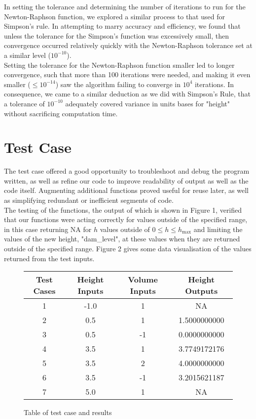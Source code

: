 \documentclass[a4paper, 11pt, oneside]{article}
\begin{document}
In setting the tolerance and determining the number of iterations to run for the Newton-Raphson function, we explored a similar process to that used for Simpson's rule. In attempting to marry accuracy and efficiency, we found that unless the tolerance for the Simpson's function was excessively small, then convergence occurred relatively quickly with the Newton-Raphson tolerance set at a similar level ($10^{-10}$). \\


Setting the tolerance for the Newton-Raphson function smaller led to longer convergence, such that more than 100 iterations were needed, and making it even smaller ($\leq 10^{-14}$) saw the algorithm failing to converge in $10^{4}$ iterations. In consequence, we came to a similar deduction as we did with Simpson’s Rule, that a tolerance of $10^{-10}$ adequately covered variance in units bases for "height" without sacrificing computation time.\\

\section{Test Case}

The test case offered a good opportunity to troubleshoot and debug the program written, as well as refine our code to improve readability of output as well as the code itself. Augmenting additional functions proved useful for reuse later, as well as simplifying redundant or inefficient segments of code.\\

The testing of the functions, the output of which is shown in Figure 1, verified that our functions were acting correctly for values outside of the specified range, in this case returning NA for $h$ values outside of $0 \leq h \leq h_{\text{max}}$
and limiting the values of the new height, "dam\_level", at these values when they are returned outside of the specified range. Figure 2 gives some data visualisation of the values returned from the test inputs.

\newpage
\begin{figure}
\centering
\begin{tabular}{|c|c c c|}
\hline
Test Cases &Height Inputs&Volume Inputs&Height Outputs\\
\hline
1   & -1.0  &     1     &      NA\\
2  &   0.5  &     1    & 1.5000000000\\
3   &  0.5    &  -1   &  0.0000000000\\
4   &  3.5    &   1   &  3.7749172176\\
5   &  3.5     &  2  &   4.0000000000\\
6   &  3.5     & -1 &    3.2015621187\\
7  &   5.0     &  1   &        NA\\
\hline
\end{tabular}
\centering

\caption{Table of test case and results}
\end{figure}
\end{document}
